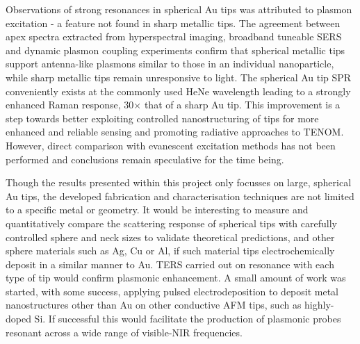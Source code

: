 \documentclass[12pt, a4paper, oneside]{book}
\begin{document}
Observations of strong resonances in spherical Au tips was attributed to plasmon excitation - a feature not found in sharp metallic tips. The agreement between apex spectra extracted from hyperspectral imaging, broadband tuneable SERS and dynamic plasmon coupling experiments confirm that spherical metallic tips support antenna-like plasmons similar to those in an individual nanoparticle, while sharp metallic tips remain unresponsive to light. The spherical Au tip SPR conveniently exists at the commonly used HeNe wavelength leading to a strongly enhanced Raman response, 30$\times$ that of a sharp Au tip. This improvement is a step towards better exploiting controlled nanostructuring of tips for more enhanced and reliable sensing and promoting radiative approaches to TENOM. However, direct comparison with evanescent excitation methods has not been performed and conclusions remain speculative for the time being.

Though the results presented within this project only focusses on large, spherical Au tips, the developed fabrication and characterisation techniques are not limited to a specific metal or geometry. It would be interesting to measure and quantitatively compare the scattering response of spherical tips with carefully controlled sphere and neck sizes to validate theoretical predictions, and other sphere materials such as Ag, Cu or Al, if such material tips electrochemically deposit in a similar manner to Au. TERS carried out on resonance with each type of tip would confirm plasmonic enhancement. A small amount of work was started, with some success, applying pulsed electrodeposition to deposit metal nanostructures other than Au on other conductive AFM tips, such as highly-doped Si. If successful this would facilitate the production of plasmonic probes resonant across a wide range of visible-NIR frequencies.
\end{document}
